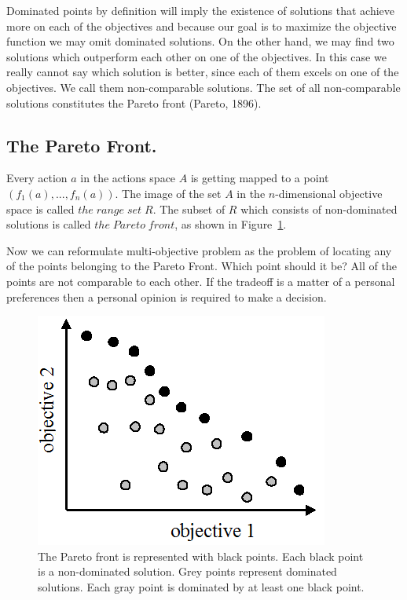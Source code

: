 Dominated points by definition will imply the existence of solutions that achieve more on each of the objectives and because our goal is to maximize the objective function we may omit dominated solutions. On the other hand, we may find two solutions which outperform each other on one of the objectives. In this case we really cannot say which solution is better, since each of them excels on one of the objectives. We call them non-comparable solutions. The set of all non-comparable solutions constitutes the Pareto front (Pareto, 1896\nocite{pareto1896cours}).

\subsection{The Pareto Front.}

Every action $a$ in the actions space $A$ is getting mapped to a point $ (f_{1}(a),...,f_{n}(a)) $. The image of the set $A$ in the $n$-dimensional objective space is called $the\; range \;set\; R$. The subset of $R$ which consists of non-dominated solutions is called $the\; Pareto\;front$, as shown in Figure~\ref{fig:paretoFront}.

Now we can reformulate multi-objective problem as the problem of locating any of the points belonging to the Pareto Front. Which point should it be? All of the points are not comparable to each other. If the tradeoff is a matter of a personal preferences then a personal opinion is required to make a decision.
\begin{figure}[ht]
\vskip 0.2in
\centering
\includegraphics[scale=0.9]{paretofront.png}
\caption{The Pareto front is represented with black points. Each black point is a non-dominated solution. Grey points represent dominated solutions. Each gray point is dominated by at least one black point.}
\vskip -0.2in
\label{fig:paretoFront}
\end{figure}


